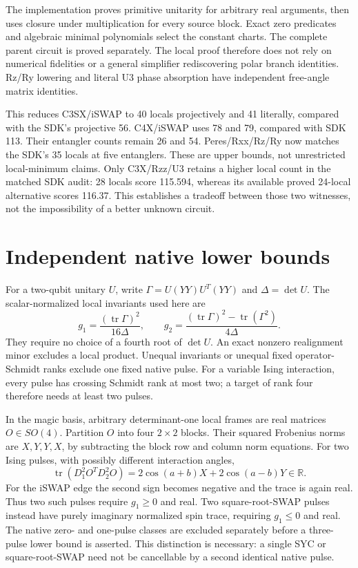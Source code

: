\documentclass[11pt]{article}
\begin{document}
The implementation proves primitive unitarity for arbitrary real arguments,
then uses closure under multiplication for every source block. Exact zero
predicates and algebraic minimal polynomials select the constant charts.
The complete parent circuit is proved separately. The local proof therefore
does not rely on numerical fidelities or a general simplifier rediscovering
polar branch identities. Rz/Ry lowering and literal U3 phase absorption have
independent free-angle matrix identities.

This reduces C3SX/iSWAP to 40 locals projectively and 41 literally, compared
with the SDK's projective 56. C4X/iSWAP uses 78 and 79, compared with SDK 113.
Their entangler counts remain 26 and 54. Peres/Rxx/Rz/Ry now matches the
SDK's 35 locals at five entanglers. These are upper bounds, not unrestricted
local-minimum claims. Only C3X/Rzz/U3 retains a higher local count in the
matched SDK audit: 28 locals score 115.594, whereas its available proved
24-local alternative scores 116.37. This establishes a tradeoff between
those two witnesses, not the impossibility of a better unknown circuit.

\section{Independent native lower bounds}
For a two-qubit unitary $U$, write $\Gamma=U(YY)U^T(YY)$ and $\Delta=\det U$.
The scalar-normalized local invariants used here are~\cite{makhlin}
\[
 g_1=\frac{(\operatorname{tr}\Gamma)^2}{16\Delta},\qquad
 g_2=\frac{(\operatorname{tr}\Gamma)^2-\operatorname{tr}(\Gamma^2)}{4\Delta}.
\]
They require no choice of a fourth root of $\det U$. An exact nonzero
realignment minor excludes a local product. Unequal invariants or unequal
fixed operator-Schmidt ranks exclude one fixed native pulse. For a variable
Ising interaction, every pulse has crossing Schmidt rank at most two;
a target of rank four therefore needs at least two pulses.

In the magic basis, arbitrary determinant-one local frames are real matrices
$O\in SO(4)$. Partition $O$ into four $2\times2$ blocks. Their squared
Frobenius norms are $X,Y,Y,X$, by subtracting the block row and column norm
equations. For two Ising pulses, with possibly different interaction angles,
\[
 \operatorname{tr}(D_1^2 O^T D_2^2 O)
 =2\cos(a+b)X+2\cos(a-b)Y\in\mathbb R.
\]
For the iSWAP edge the second sign becomes negative and the trace is again
real. Thus two such pulses require $g_1\geq0$ and real. Two square-root-SWAP
pulses instead have purely imaginary normalized spin trace, requiring
$g_1\leq0$ and real. The native zero- and one-pulse classes are excluded
separately before a three-pulse lower bound is asserted. This distinction is
necessary: a single SYC or square-root-SWAP need not be cancellable by a
second identical native pulse.
\end{document}
